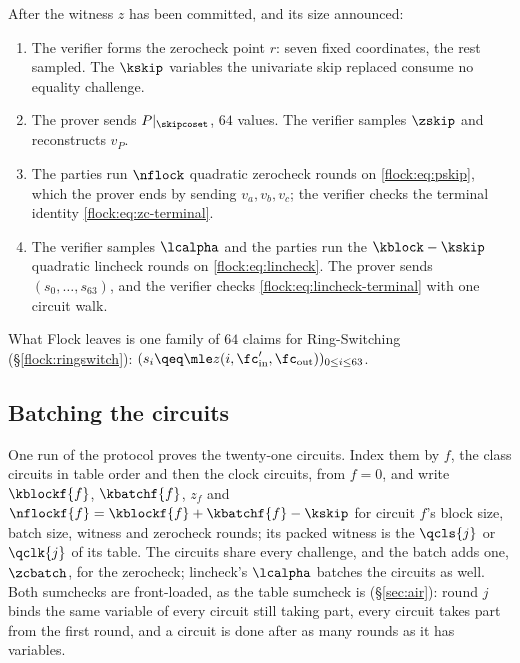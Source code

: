 \begin{protocol}\label{flock:protocol}
After the witness $z$ has been committed, and its size announced:
\begin{enumerate}
\item The verifier forms the zerocheck point $r$: seven fixed coordinates, the rest sampled. The $\kskip$ variables the univariate skip replaced consume no equality challenge.
\item The prover sends $P|_{\skipcoset}$, $64$ values. The verifier samples $\zskip$ and reconstructs $v_P$.
\item The parties run $\nflock$ quadratic zerocheck rounds on \eqref{flock:eq:pskip}, which the prover ends by sending $v_a,v_b,v_c$; the verifier checks the terminal identity \eqref{flock:eq:zc-terminal}.
\item The verifier samples $\lcalpha$ and the parties run the $\kblock-\kskip$ quadratic lincheck rounds on \eqref{flock:eq:lincheck}. The prover sends $(s_0,\ldots,s_{63})$, and the verifier checks \eqref{flock:eq:lincheck-terminal} with one circuit walk.
\end{enumerate}
What Flock leaves is one family of $64$ claims for Ring-Switching (\S\ref{flock:ringswitch}): $(s_i \qeq \mle z(i, \fc'_{\mathrm{in}},\fc_{\mathrm{out}}))_{0 \leq i \leq 63}$.
\end{protocol}

\subsection{Batching the circuits}\label{flock:batch}

One run of the protocol proves the twenty-one circuits. Index them by $f$, the class circuits in table order and then the clock circuits, from $f=0$, and write $\kblockf{f}$, $\kbatchf{f}$, $z_f$ and $\nflockf{f}=\kblockf{f}+\kbatchf{f}-\kskip$ for circuit $f$'s block size, batch size, witness and zerocheck rounds; its packed witness is the $\qcls{j}$ or $\qclk{j}$ of its table. The circuits share every challenge, and the batch adds one, $\zcbatch$, for the zerocheck; lincheck's $\lcalpha$ batches the circuits as well. Both sumchecks are front-loaded, as the table sumcheck is (\S\ref{sec:air}): round $j$ binds the same variable of every circuit still taking part, every circuit takes part from the first round, and a circuit is done after as many rounds as it has variables.

